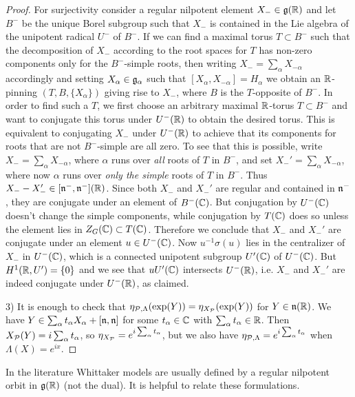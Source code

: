 \documentclass{article}
\theoremstyle{definition}
\numberwithin{equation}{section}
\renewcommand{\-}{\hyp{}}
\newcommand{\g}{\mathfrak g}
\begin{document}
\begin{proof}
For surjectivity consider a regular nilpotent element
$X_- \in \mathfrak{g}(\mathbb{R})$ and let $B^-$ be the unique Borel subgroup such
that $X_-$ is contained in the Lie algebra of the unipotent radical
$U^-$ of $B^-$. If we can find a maximal torus $T \subset B^-$ such
that the decomposition of $X_-$ according to the root spaces for $T$
has non-zero components only for the $B^-$-simple roots, then writing
$X_-=\sum_\alpha X_{-\alpha}$ accordingly and setting
$X_\alpha \in \mathfrak{g}_\alpha$ such that
$[X_\alpha,X_{-\alpha}]=H_\alpha$ we obtain an $\mathbb{R}$-pinning
$(T,B,\{X_\alpha\})$ giving rise to $X_-$, where $B$ is the
$T$-opposite of $B^-$. In order to find such a $T$, we first choose an
arbitrary maximal $\mathbb{R}$-torus $T \subset B^-$ and want to conjugate
this torus under $U^-(\mathbb{R})$ to obtain the desired torus. This is
equivalent to conjugating $X_-$ under $U^-(\mathbb{R})$ to achieve that its
components for roots that are not $B^-$-simple are all zero. To see
that this is possible, write $X_-=\sum_\alpha X_{-\alpha}$, where
$\alpha$ runs over \emph{all} roots of $T$ in $B^-$, and set
$X_-'=\sum_\alpha X_{-\alpha}$, where now $\alpha$ runs over
\emph{only the simple} roots of $T$ in $B^-$. Thus
$X_--X_-' \in [\mathfrak{n}^-,\mathfrak{n}^-](\mathbb{R})$. Since both $X_-$ and $X_-'$
are regular and contained in $\mathfrak{n}^-$, they are conjugate under an
element of $B^-(\mathbb{C})$. But conjugation by $U^-(\mathbb{C})$ doesn't change the
simple components, while conjugation by $T(\mathbb{C})$ does so unless the
element lies in $Z_G(\mathbb{C}) \subset T(\mathbb{C})$. Therefore we conclude that
$X_-$ and $X_-'$ are conjugate under an element $u \in U^-(\mathbb{C})$. Now
$u^{-1}\sigma(u)$ lies in the centralizer of $X_-$ in $U^-(\mathbb{C})$, which
is a connected unipotent subgroup $U'(\mathbb{C})$ of $U^-(\mathbb{C})$. But
$H^1(\mathbb{R},U')=\{0\}$ and we see that $uU'(\mathbb{C})$ intersects
$U^-(\mathbb{R})$, i.e. $X_-$ and $X_-'$ are indeed conjugate under $U^-(\mathbb{R})$,
as claimed.

3) It is enough to check that $\eta_{\mathcal{P},\Lambda}(\exp(Y))=\eta_{X_{\mathcal{P}}}(\exp(Y))$ for $Y \in \mathfrak{n}(\mathbb{R})$. We have $Y \in \sum_\alpha t_\alpha X_\alpha + [\mathfrak{n},\mathfrak{n}]$ for some $t_\alpha \in \mathbb{C}$ with $\sum_\alpha t_\alpha \in \mathbb{R}$. Then $X_{\mathcal{P}}(Y)=i\sum_\alpha t_\alpha$, so $\eta_{X_{\mathcal{P}}}=e^{i\sum_\alpha t_\alpha}$, but we also have $\eta_{\mathcal{P},\Lambda}=e^{i\sum_\alpha t_\alpha}$ when $\Lambda(X)=e^{ix}$.
\end{proof}



In the literature Whittaker models are usually defined by a regular
nilpotent orbit in $\g(\R)$ (not the dual). It is helpful to relate
these formulations.
\end{document}

